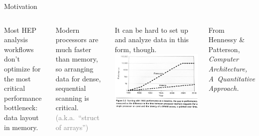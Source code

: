 \documentclass[aspectratio=169]{beamer}
\begin{document}
\begin{frame}{Motivation}
\begin{columns}
Most HEP analysis workflows don't optimize for the most critical performance bottleneck: data layout in memory.

\vspace{0.5 cm}
Modern processors are much faster than memory, so arranging data for dense, sequential scanning is critical. \textcolor{gray}{(a.k.a.\ ``struct of arrays'')}

\vspace{0.5 cm}
It can be hard to set up and analyze data in this form, though.
\vspace{0.3 cm}
\includegraphics[width=\linewidth]{performance-gap.jpg}

\vspace{0.25 cm}
\begin{columns}
\tiny
From Hennessy \& Patterson, {\it Computer Architecture, A~Quantitative Approach.}


\end{columns}
\end{columns}
\end{frame}
\end{document}
